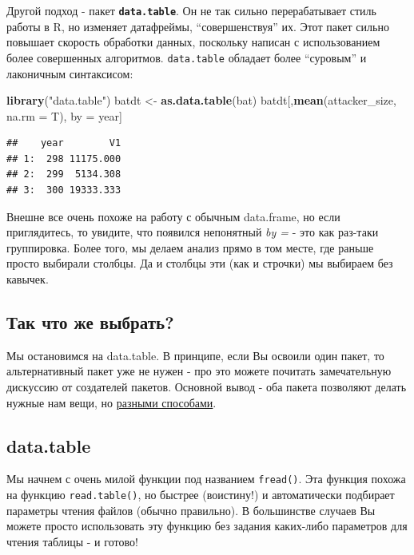 \documentclass[]{book}
\newenvironment{Shaded}{\begin{snugshade}}{\end{snugshade}}
\newcommand{\KeywordTok}[1]{\textcolor[rgb]{0.13,0.29,0.53}{\textbf{#1}}}
\newcommand{\DataTypeTok}[1]{\textcolor[rgb]{0.13,0.29,0.53}{#1}}
\newcommand{\StringTok}[1]{\textcolor[rgb]{0.31,0.60,0.02}{#1}}
\newcommand{\NormalTok}[1]{#1}
\begin{document}
Другой подход - пакет \textbf{\texttt{data.table}}. Он не так сильно
перерабатывает стиль работы в R, но изменяет датафреймы,
``совершенствуя'' их. Этот пакет сильно повышает скорость обработки
данных, поскольку написан с использованием более совершенных алгоритмов.
\texttt{data.table} обладает более ``суровым'' и лаконичным синтаксисом:

\begin{Shaded}
\begin{Highlighting}[]
\KeywordTok{library}\NormalTok{(}\StringTok{"data.table"}\NormalTok{)}
\NormalTok{batdt <-}\StringTok{ }\KeywordTok{as.data.table}\NormalTok{(bat)}
\NormalTok{batdt[,}\KeywordTok{mean}\NormalTok{(attacker_size, }\DataTypeTok{na.rm =}\NormalTok{ T), by =}\StringTok{ }\NormalTok{year]}
\end{Highlighting}
\end{Shaded}

\begin{verbatim}
##    year        V1
## 1:  298 11175.000
## 2:  299  5134.308
## 3:  300 19333.333
\end{verbatim}

Внешне все очень похоже на работу с обычным data.frame, но если
приглядитесь, то увидите, что появился непонятный \emph{by =} - это как
раз-таки группировка. Более того, мы делаем анализ прямо в том месте,
где раньше просто выбирали столбцы. Да и столбцы эти (как и строчки) мы
выбираем без кавычек.

\subsection{Так что же выбрать?}\label{what}

Мы остановимся на data.table. В принципе, если Вы освоили один пакет, то
альтернативный пакет уже не нужен - про это можете почитать
замечательную дискуссию от создателей пакетов. Основной вывод - оба
пакета позволяют делать нужные нам вещи, но
\href{https://stackoverflow.com/questions/21435339/data-table-vs-dplyr-can-one-do-something-well-the-other-cant-or-does-poorly}{разными
способами}.

\subsection{data.table}\label{dt}

Мы начнем с очень милой функции под названием \texttt{fread()}. Эта
функция похожа на функцию \texttt{read.table()}, но быстрее (воистину!)
и автоматически подбирает параметры чтения файлов (обычно правильно). В
большинстве случаев Вы можете просто использовать эту функцию без
задания каких-либо параметров для чтения таблицы - и готово!
\end{document}
